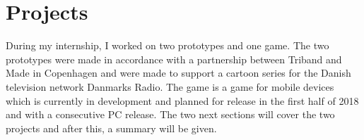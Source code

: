 \section{Projects}
During my internship, I worked on two prototypes and one game. The two prototypes were made in accordance with a partnership between Triband and Made in Copenhagen and were made to support a cartoon series for the Danish television network Danmarks Radio. The game is a game for mobile devices which is currently in development and planned for release in the first half of 2018 and with a consecutive PC release. The two next sections will cover the two projects and after this, a summary will be given.
